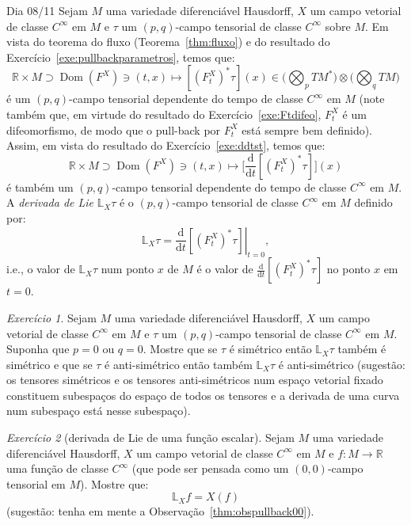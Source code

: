 \documentclass[oneside,11pt]{amsart}
\newcommand{\R}{\mathds R}
\newcommand{\dd}{\mathrm d}
\DeclareMathOperator{\Dom}{Dom}
\theoremstyle{remark}\newtheorem{exercise}{Exercício}[section]
\theoremstyle{plain}\newtheorem{teo}{Teorema}[section]
\theoremstyle{plain}\newtheorem{lem}[teo]{Lema}
\theoremstyle{plain}\newtheorem{prop}[teo]{Proposição}
\theoremstyle{definition}\newtheorem{defin}[teo]{Definição}
\theoremstyle{remark}\newtheorem{rem}[teo]{Observação}
\theoremstyle{definition}\newtheorem{example}[teo]{Exemplo}
\numberwithin{equation}{section}
\begin{document}
\begin{section}{Dia 08/11}
Sejam $M$ uma variedade diferenciável Hausdorff, $X$ um campo vetorial de classe $C^\infty$ em $M$ e $\tau$ um $(p,q)$-campo tensorial
de classe $C^\infty$ sobre $M$. Em vista do teorema do fluxo (Teorema~\ref{thm:fluxo}) e do resultado do Exercício~\ref{exe:pullbackparametros},
temos que:
\[\R\times M\supset\Dom(F^X)\ni(t,x)\longmapsto[(F^X_t)^*\tau](x)\in\Big(\bigotimes_pTM^*\Big)\otimes\Big(\bigotimes_qTM\Big)\]
é um $(p,q)$-campo tensorial dependente do tempo de classe $C^\infty$ em $M$ (note também que, em virtude do resultado do Exercício~\ref{exe:Ftdifeo},
$F^X_t$ é um difeomorfismo, de modo que o pull-back por $F^X_t$ está sempre bem definido). Assim, em vista do resultado do Exercício~\ref{exe:ddtst},
temos que:
\[\R\times M\supset\Dom(F^X)\ni(t,x)\longmapsto\Big[\frac{\dd}{\dd t}[(F^X_t)^*\tau]\Big](x)\]
é também um $(p,q)$-campo tensorial dependente do tempo de classe $C^\infty$ em $M$. A {\em derivada de Lie\/} $\mathbb L_X\tau$ é o
$(p,q)$-campo tensorial de classe $C^\infty$ em $M$ definido por:
\[\mathbb L_X\tau=\left.\frac{\dd}{\dd t}[(F^X_t)^*\tau]\right\vert_{t=0},\]
i.e., o valor de $\mathbb L_X\tau$ num ponto $x$ de $M$ é o valor de $\frac{\dd}{\dd t}[(F^X_t)^*\tau]$ no ponto $x$ em $t=0$.

\begin{exercise}
Sejam $M$ uma variedade diferenciável Hausdorff, $X$ um campo vetorial de classe $C^\infty$ em $M$ e $\tau$ um $(p,q)$-campo tensorial
de classe $C^\infty$ em $M$. Suponha que $p=0$ ou $q=0$. Mostre que se $\tau$ é simétrico então $\mathbb L_X\tau$ também
é simétrico e que se $\tau$ é anti-simétrico então também $\mathbb L_X\tau$ é anti-simétrico (sugestão: os tensores simétricos e os tensores anti-simétricos
num espaço vetorial fixado constituem subespaços do espaço de todos os tensores e a derivada de uma curva num subespaço está nesse subespaço).
\end{exercise}

\begin{exercise}[derivada de Lie de uma função escalar]\label{exe:derLieescalar}
Sejam $M$ uma variedade diferenciável Hausdorff, $X$ um campo vetorial de classe $C^\infty$ em $M$ e $f:M\to\R$ uma função de classe $C^\infty$
(que pode ser pensada como um $(0,0)$-campo tensorial em $M$). Mostre que:
\[\mathbb L_Xf=X(f)\]
(sugestão: tenha em mente a Observação~\ref{thm:obspullback00}).
\end{exercise}


\end{section}
\end{document}
